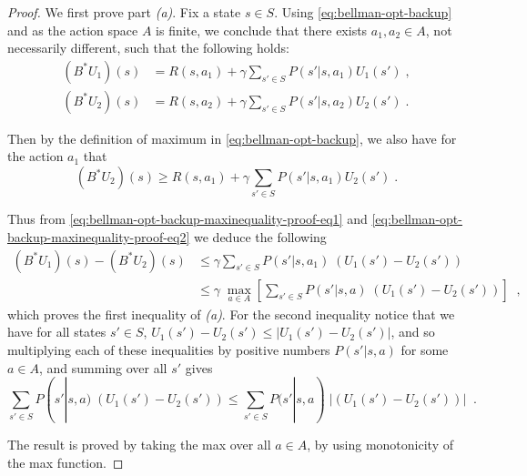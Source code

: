 \documentclass{article}
\theoremstyle{definition}
\theoremstyle{remark}
\begin{document}
\begin{proof}
We first prove part \textit{(a)}. Fix a state $s \in S$. Using \eqref{eq:bellman-opt-backup} and as the action space $A$ is finite, we conclude that there exists $a_1,a_2 \in A$, not necessarily different, such that the following holds:
\begin{equation}
\begin{split}
(B^{\ast}U_1)(s) &= R(s,a_1) + \gamma \sum_{s' \in S} P(s'|s,a_1)U_1(s') \;,\\
(B^{\ast}U_2)(s) &= R(s,a_2) + \gamma \sum_{s' \in S} P(s'|s,a_2)U_2(s') \;.
\end{split}
\label{eq:bellman-opt-backup-maxinequality-proof-eq1}
\end{equation}

Then by the definition of maximum in \eqref{eq:bellman-opt-backup}, we also have for the action $a_1$ that
\begin{equation}
(B^{\ast}U_2)(s) \geq R(s,a_1) + \gamma \sum_{s' \in S} P(s'|s,a_1)U_2(s') \;.
\label{eq:bellman-opt-backup-maxinequality-proof-eq2}
\end{equation}

Thus from \eqref{eq:bellman-opt-backup-maxinequality-proof-eq1} and \eqref{eq:bellman-opt-backup-maxinequality-proof-eq2} we deduce the following
\begin{equation}
\begin{split}
(B^{\ast}U_1)(s) - (B^{\ast}U_2)(s) & \leq \gamma \sum_{s' \in S} P(s'|s,a_1) \; (U_1(s') - U_2(s')) \\
& \leq \gamma \; \underset{a \in A}{\max} \left[ \sum_{s' \in S} P(s'|s,a) \; (U_1(s') - U_2(s')) \right] \;\;,
\end{split}
\label{eq:bellman-opt-backup-maxinequality-proof-eq3}
\end{equation}
which proves the first inequality of \textit{(a)}. For the second inequality notice that we have for all states $s' \in S$, $U_1(s') - U_2(s') \leq |U_1(s') - U_2(s')|$, and so multiplying each of these inequalities by positive numbers $P(s'|s,a)$ for some $a \in A$, and summing over all $s'$ gives
\begin{equation}
\sum_{s' \in S} P(s'|s,a) \; (U_1(s') - U_2(s')) \leq \sum_{s' \in S} P(s'|s,a) \; |(U_1(s') - U_2(s'))| \;\;.
\label{eq:bellman-opt-backup-maxinequality-proof-eq4}
\end{equation}

The result is proved by taking the max over all $a \in A$, by using monotonicity of the max function.


\end{proof}
\end{document}
